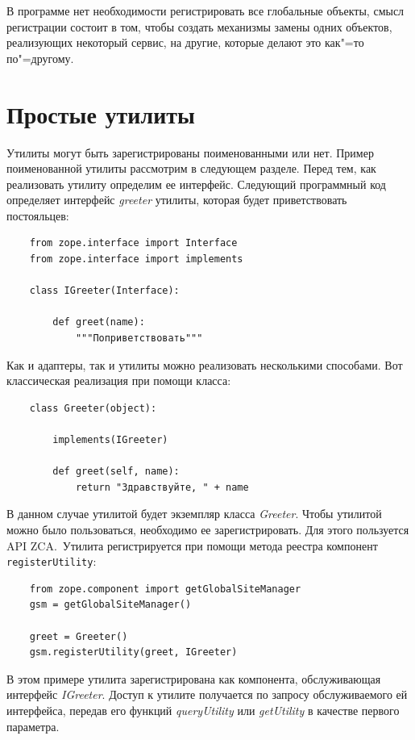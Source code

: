 \documentclass[a4paper,openany,twoside,final]{book}
\providecommand*{\DUroletitlereference}[1]{\textsl{#1}}
\begin{document}
В программе нет необходимости регистрировать все глобальные объекты, смысл регистрации состоит в том, чтобы создать механизмы замены одних объектов, реализующих некоторый сервис, на другие, которые делают это как"=то по"=другому.


\section{Простые утилиты%
  \label{id41}%
}

Утилиты могут быть зарегистрированы поименованными или нет.  Пример поименованной утилиты рассмотрим в следующем разделе.  Перед тем, как реализовать утилиту определим ее интерфейс.  Следующий программный код определяет интерфейс \DUroletitlereference{greeter} утилиты, которая будет приветствовать постояльцев:

\begin{verbatim}
    from zope.interface import Interface
    from zope.interface import implements

    class IGreeter(Interface):

        def greet(name):
            """Поприветствовать"""
\end{verbatim}

Как и адаптеры, так и утилиты можно реализовать несколькими способами.  Вот классическая реализация при помощи класса:

\begin{verbatim}
    class Greeter(object):

        implements(IGreeter)

        def greet(self, name):
            return "Здравствуйте, " + name
\end{verbatim}

В данном случае утилитой будет экземпляр класса \DUroletitlereference{Greeter}.  Чтобы утилитой можно было пользоваться, необходимо ее зарегистрировать.  Для этого пользуется API ZCA.~Утилита регистрируется при помощи метода реестра компонент \texttt{registerUtility}:

\begin{verbatim}
    from zope.component import getGlobalSiteManager
    gsm = getGlobalSiteManager()

    greet = Greeter()
    gsm.registerUtility(greet, IGreeter)
\end{verbatim}

В этом примере утилита зарегистрирована как компонента, обслуживающая интерфейс \DUroletitlereference{IGreeter}.  Доступ к утилите получается по запросу обслуживаемого ей интерфейса, передав его функций \DUroletitlereference{queryUtility} или \DUroletitlereference{getUtility} в качестве первого параметра.
\end{document}

